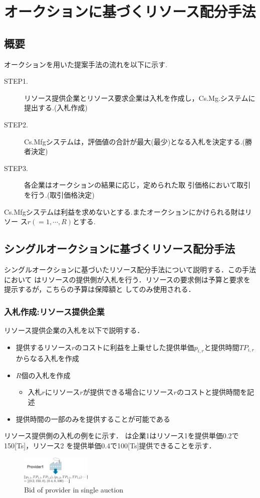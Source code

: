 \documentclass{ujarticle}
\begin{document}
\section{オークションに基づくリソース配分手法}
\subsection{概要}
オークションを用いた提案手法の流れを以下に示す.
\begin{description}
\item [STEP1.] {リソース提供企業とリソース要求企業は入札を作成し，Cs.Mg.システムに提出する.(入札作成)}
\item [STEP2.] {Cs.Mfgシステムは，評価値の合計が最大(最少)となる入札を決定する.(勝者決定)}
\item [STEP3.] {各企業はオークションの結果に応じ，定められた取 引価格において取引を行う.(取引価格決定)}
\end{description}
Cs.Mfgシステムは利益を求めないとする.またオークションにかけられる財はリソー
ス$r(=1,\cdots ,R)$とする.
\subsection{シングルオークションに基づくリソース配分手法}
シングルオークションに基づいたリソース配分手法について説明する．この手法において
はリソースの提供側が入札を行う．リソースの要求側は予算と要求を提示するが，こちらの予算は保障額と
してのみ使用される．
\subsubsection{入札作成:リソース提供企業}
リソース提供企業の入札を以下で説明する．
\begin{itemize}
\item {提供するリソース$r$のコストに利益を上乗せした提供単価$p_{i,r}$と提供時間$TP_{i,r}$からなる入札を作成}
\item {$R$個の入札を作成}
 \begin{itemize}
 \item {入札$r$にリソース$r$が提供できる場合にリソース$r$のコストと提供時間を記述}
 \end{itemize}
\item {提供時間の一部のみを提供することが可能である}
\end{itemize}
リソース提供側の入札の例をに示す．
は企業1はリソース1を提供単価0.2で150[Ts]，リソース2
を提供単価0.4で100[Ts]提供できることを示す．
\begin{figure}[H]
  \centering
  \includegraphics[width=0.3\textwidth]{bid-provider-single.pdf} 
  \caption{Bid of provider in single auction}
  \label{fig:bid-provider-single}
\end{figure}
\end{document}
